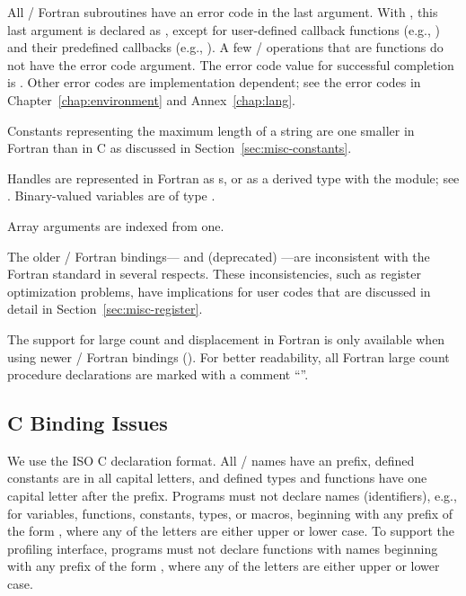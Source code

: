 All \MPI/ Fortran subroutines have an error code in the last argument.
With  , this last argument is
declared as , except for user-defined callback
functions (e.g.,
%
) and their
predefined callbacks (e.g., ).
A few \MPI/ operations that are functions do not have the error code argument.
The error code value for successful completion is
.  Other error codes are implementation dependent;
see the error codes in
Chapter~\ref{chap:environment} and Annex~\ref{chap:lang}.

Constants representing the maximum length of a string are one smaller
in Fortran than in C as discussed in Section~\ref{sec:misc-constants}.

Handles are represented in Fortran as
s, or
as a  derived type with the  module;
see .
Binary-valued variables are of type .

Array arguments are indexed from one.

The older \MPI/ Fortran bindings--- and (deprecated) ---are
inconsistent with the Fortran
standard in several respects. These
inconsistencies, such as register optimization problems,
have
implications for user codes that are discussed in detail
in Section~\ref{sec:misc-register}.

The support for large count and displacement in Fortran is only available
when using newer \MPI/ Fortran bindings
().
For better readability, all Fortran large count procedure declarations
are marked with a comment ``''.

\subsection{C Binding Issues}
\label{sec:c-binding-issues}

We use the ISO C
declaration format.  All \MPI/ names have an 
prefix, defined constants are in all capital letters, and defined types and
functions have one capital letter after the prefix.
Programs must not declare names (identifiers), e.g., for
variables, functions, constants, types, or macros,
beginning with
any prefix of the form ,
where any of the letters are either upper or lower case.
To support the profiling interface, programs must not declare
functions with names beginning with any prefix of the form ,
where any of the letters are either upper or lower case.

